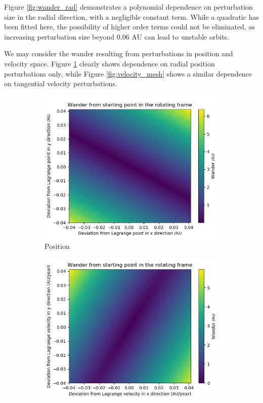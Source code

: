 \documentclass[11pt, a4paper,twocolumn]{article} %
\begin{document}
Figure \ref{fig:wander_rad} demonstrates a polynomial dependence on perturbation size in the radial direction, with a negligible constant term. While a quadratic has been fitted here, the possibility of higher order terms could not be eliminated, as increasing perturbation size beyond 0.06 AU can lead to unstable orbits.

We may consider the wander resulting from perturbations in position and velocity space. Figure \ref{fig:position_mesh} clearly shows dependence on radial position perturbations only, while Figure \ref{fig:velocity_mesh} shows a similar dependence on tangential velocity perturbations.

\begin{figure}[ht]
	\centering
	\begin{subfigure}{.45\textwidth}
		\centering
		\includegraphics[width=\linewidth]{Figures/testcolourmesh6}  
		\caption{Position}
		\label{fig:position_mesh}
	\end{subfigure}
	\hfill %
	\begin{subfigure}{.45\textwidth}
		\centering
		\includegraphics[width=\linewidth]{Figures/testvelocitymesh2}  

\end{subfigure}
\end{figure}
\end{document}
